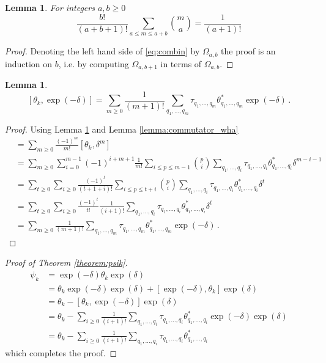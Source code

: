 \documentclass[english,letter paper,12pt,leqno]{article}
\newtheorem{lemma}[theorem]{Lemma}
\theoremstyle{example}
\numberwithin{equation}{section}
\begin{document}
\begin{lemma}\label{lemma:combin} For integers $a, b \ge 0$
\begin{equation}\label{eq:combin}
\frac{b!}{(a+b+1)!} \sum_{a \le m \le a + b} \binom{m}{a} = \frac{1}{(a+1)!}
\end{equation}
\end{lemma}
\begin{proof}
Denoting the left hand side of \eqref{eq:combin} by $\Omega_{a,b}$ the proof is an induction on $b$, i.e. by computing $\Omega_{a,b+1}$ in terms of $\Omega_{a,b}$.
\end{proof}

\begin{lemma}
\[
[\theta_k, \exp(-\delta)] = \sum_{m \ge 0} \frac{1}{(m+1)!} \sum_{q_1,\ldots,q_m} \tau_{q_1,\ldots,q_m} \theta^*_{q_1,\ldots,q_m} \exp(-\delta)\,.
\]
\end{lemma}
\begin{proof}
Using Lemma \ref{lemma:combin} and Lemma \ref{lemma:commutator_wha}
\begin{align*}
[\theta_k, \exp(-\delta)] &= \sum_{m \ge 0} \frac{(-1)^m}{m!} [\theta_k, \delta^m]\\
&= \sum_{m \ge 0} \sum_{i=0}^{m-1} (-1)^{i+m+1} \frac{1}{m!} \sum_{i \le p \le m -1} \binom{p}{i} \sum_{q_1,\ldots,q_i} \tau_{q_1,\ldots,q_i} \theta_{q_1,\ldots,q_i}^* \delta^{m-i-1}\\
&= \sum_{t \ge 0} \sum_{i \ge 0} \frac{(-1)^t}{(t+1+i)!} \sum_{i \le p \le t + i} \binom{p}{i} \sum_{q_1,\ldots,q_i} \tau_{q_1,\ldots,q_i} \theta_{q_1,\ldots,q_i}^* \delta^t\\
&= \sum_{t \ge 0} \sum_{i \ge 0} \frac{(-1)^t}{t!} \frac{1}{(i+1)!} \sum_{q_1,\ldots,q_i} \tau_{q_1,\ldots,q_i} \theta^*_{q_1,\ldots,q_i} \delta^t\\
&= \sum_{m \ge 0} \frac{1}{(m+1)!} \sum_{q_1,\ldots,q_m} \tau_{q_1,\ldots,q_m} \theta^*_{q_1,\ldots,q_m} \exp(-\delta)\,.
\end{align*}
\end{proof}

\begin{proof}[Proof of Theorem \ref{theorem:psik}] 
\begin{align*}
\psi_k &= \exp(-\delta) \theta_k \exp(\delta)\\
&= \theta_k \exp(-\delta) \exp(\delta) + [ \exp(-\delta), \theta_k ] \exp(\delta)\\
&= \theta_k - [ \theta_k, \exp(-\delta) ] \exp(\delta)\\
&= \theta_k - \sum_{i \ge 0} \frac{1}{(i+1)!} \sum_{q_1,\ldots,q_i} \tau_{q_1,\ldots,q_i} \theta^*_{q_1,\ldots,q_i} \exp(-\delta) \exp(\delta)\\
&= \theta_k - \sum_{i \ge 0} \frac{1}{(i+1)!} \sum_{q_1,\ldots,q_i} \tau_{q_1,\ldots,q_i} \theta^*_{q_1,\ldots,q_i} 
\end{align*}
which completes the proof.
\end{proof}
\end{document}
